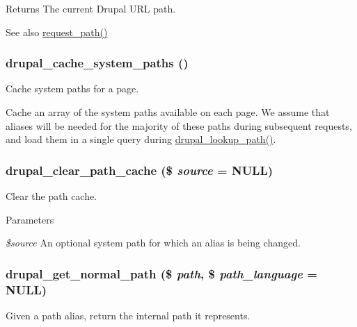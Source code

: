 \begin{DoxyReturn}{Returns}
The current Drupal URL path.
\end{DoxyReturn}
\begin{DoxySeeAlso}{See also}
\hyperlink{bootstrap_8inc_a58aae06c8c4282de3a6e292353bac1c0}{request\_\-path()} 
\end{DoxySeeAlso}
\hypertarget{path_8inc_a60e3f93b8388973df3e4f98788fd5388}{
\subsubsection[{drupal\_\-cache\_\-system\_\-paths}]{\setlength{\rightskip}{0pt plus 5cm}drupal\_\-cache\_\-system\_\-paths ()}}
\label{path_8inc_a60e3f93b8388973df3e4f98788fd5388}
Cache system paths for a page.

Cache an array of the system paths available on each page. We assume that aliases will be needed for the majority of these paths during subsequent requests, and load them in a single query during \hyperlink{path_8inc_a3c1a94088895986eedd4358367355e33}{drupal\_\-lookup\_\-path()}. \hypertarget{path_8inc_ac2787f2b1d751f7c77e7ef3db2ff11e1}{
\subsubsection[{drupal\_\-clear\_\-path\_\-cache}]{\setlength{\rightskip}{0pt plus 5cm}drupal\_\-clear\_\-path\_\-cache (\$ {\em source} = {\ttfamily NULL})}}
\label{path_8inc_ac2787f2b1d751f7c77e7ef3db2ff11e1}
Clear the path cache.


\begin{DoxyParams}{Parameters}
\item[{\em \$source}]An optional system path for which an alias is being changed. \end{DoxyParams}
\hypertarget{path_8inc_a59781811cbcdef4c64ccd1d55e1ae9f8}{
\subsubsection[{drupal\_\-get\_\-normal\_\-path}]{\setlength{\rightskip}{0pt plus 5cm}drupal\_\-get\_\-normal\_\-path (\$ {\em path}, \/  \$ {\em path\_\-language} = {\ttfamily NULL})}}
\label{path_8inc_a59781811cbcdef4c64ccd1d55e1ae9f8}
Given a path alias, return the internal path it represents.


